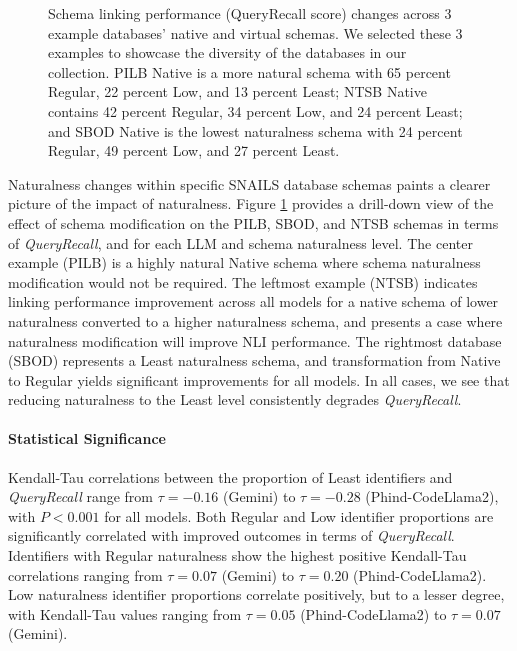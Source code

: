 \begin{figure}
\begin{subfigure}{\figwidthmod\linewidth}
  \end{subfigure}
  \caption{Schema linking performance (QueryRecall score) changes across 3 example databases' native and virtual schemas. We selected these 3 examples to showcase the diversity of the databases in our collection. PILB Native is a more natural schema with 65 percent Regular, 22 percent Low, and 13 percent Least; NTSB Native contains 42 percent Regular, 34 percent Low, and 24 percent Least; and SBOD Native is the lowest naturalness schema with 24 percent Regular, 49 percent Low, and 27 percent Least.}
  \label{fig:recall-boxplot-dbs}
\end{figure}

Naturalness changes within specific SNAILS database schemas paints a clearer picture of the impact of naturalness.
Figure \ref{fig:recall-boxplot-dbs} provides a drill-down view of the effect of schema modification on the PILB, SBOD, and NTSB schemas in terms of \emph{QueryRecall}, and for each LLM and schema naturalness level.
The center example (PILB) is a highly natural Native schema where schema naturalness modification would not be required. The leftmost example (NTSB) indicates linking performance improvement across all models for a native schema of lower naturalness converted to a higher naturalness schema, and presents a case where naturalness modification will improve NLI performance. The rightmost database (SBOD) represents a Least naturalness schema, and transformation from Native to Regular yields significant improvements for all models. In all cases, we see that reducing naturalness to the Least level consistently degrades \emph{QueryRecall}. 

\paragraph{\textbf{Statistical Significance}}
Kendall-Tau correlations between the proportion of Least identifiers and \emph{QueryRecall} range from $\tau=-0.16$ (Gemini) to $\tau=-0.28$ (Phind-CodeLlama2), with $P < 0.001$ for all models.
Both Regular and Low identifier proportions are significantly correlated with improved outcomes in terms of \emph{QueryRecall}.
Identifiers with Regular naturalness show the highest positive Kendall-Tau correlations ranging from $\tau=0.07$ (Gemini) to $\tau=0.20$ (Phind-CodeLlama2).
Low naturalness identifier proportions correlate positively, but to a lesser degree, with Kendall-Tau values ranging from $\tau=0.05$ (Phind-CodeLlama2) to $\tau=0.07$ (Gemini).

